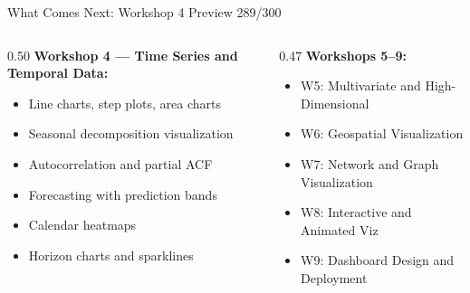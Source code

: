 \documentclass[10pt]{beamer}
\newcommand{\smark}[1]{\hfill{\scriptsize\color{codegray}#1}}
\begin{document}
\begin{frame}{What Comes Next: Workshop 4 Preview}
\smark{289/300}
\begin{columns}[T]
\begin{column}{0.50\textwidth}
    \textbf{Workshop 4 --- Time Series and Temporal Data:}
    \begin{itemize}
        \item Line charts, step plots, area charts
        \item Seasonal decomposition visualization
        \item Autocorrelation and partial ACF
        \item Forecasting with prediction bands
        \item Calendar heatmaps
        \item Horizon charts and sparklines
    \end{itemize}
\end{column}
\begin{column}{0.47\textwidth}
    \textbf{Workshops 5--9:}
    \begin{itemize}
        \item W5: Multivariate and High-Dimensional
        \item W6: Geospatial Visualization
        \item W7: Network and Graph Visualization
        \item W8: Interactive and Animated Viz
        \item W9: Dashboard Design and Deployment
    \end{itemize}
\end{column}
\end{columns}
\end{frame}
\end{document}
